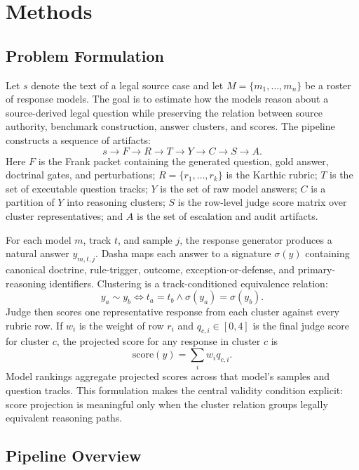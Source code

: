 \section{Methods}

\subsection{Problem Formulation}

Let \(s\) denote the text of a legal source case and let \(M=\{m_1,\ldots,m_n\}\)
be a roster of response models. The goal is to estimate how the models reason
about a source-derived legal question while preserving the relation between
source authority, benchmark construction, answer clusters, and scores. The
pipeline constructs a sequence of artifacts:
\[
s \rightarrow F \rightarrow R \rightarrow T \rightarrow Y \rightarrow C
\rightarrow S \rightarrow A .
\]
Here \(F\) is the Frank packet containing the generated question, gold answer,
doctrinal gates, and perturbations; \(R=\{r_1,\ldots,r_k\}\) is the Karthic
rubric; \(T\) is the set of executable question tracks; \(Y\) is the set of raw
model answers; \(C\) is a partition of \(Y\) into reasoning clusters; \(S\) is
the row-level judge score matrix over cluster representatives; and \(A\) is the
set of escalation and audit artifacts.

For each model \(m\), track \(t\), and sample \(j\), the response generator
produces a natural answer \(y_{m,t,j}\). Dasha maps each answer to a signature
\(\sigma(y)\) containing canonical doctrine, rule-trigger, outcome,
exception-or-defense, and primary-reasoning identifiers. Clustering is a
track-conditioned equivalence relation:
\[
y_a \sim y_b \iff t_a=t_b \land \sigma(y_a)=\sigma(y_b).
\]
Judge then scores one representative response from each cluster against every
rubric row. If \(w_i\) is the weight of row \(r_i\) and \(q_{c,i}\in[0,4]\) is
the final judge score for cluster \(c\), the projected score for any response in
cluster \(c\) is
\[
\mathrm{score}(y)=\sum_i w_i q_{c,i}.
\]
Model rankings aggregate projected scores across that model's samples and
question tracks. This formulation makes the central validity condition explicit:
score projection is meaningful only when the cluster relation groups legally
equivalent reasoning paths.

\subsection{Pipeline Overview}

